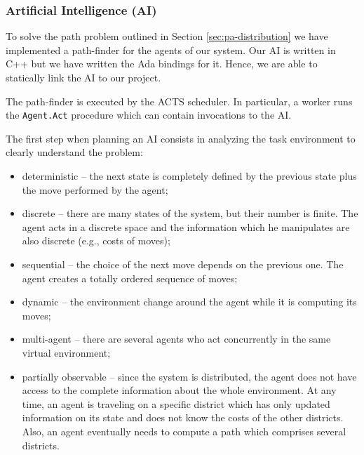\subsubsection{Artificial Intelligence (AI)}

To solve the path
problem outlined in Section \ref{sec:pa-distribution}
we have implemented a path-finder for the agents of our system.
Our AI is written in C++ but we have written the Ada bindings for it.
Hence, we are able to statically link the AI to our project.

The path-finder is executed by the ACTS scheduler. In particular, a
worker runs the \verb|Agent.Act| procedure which can contain invocations
to the AI.




The first step when planning an AI consists in analyzing the task environment
to clearly understand the problem:

\begin{itemize}

\item{deterministic} --
the next state is completely defined by the previous state plus the move
performed by the agent;

\item{discrete} --
there are many states of the system, but their number is finite.
The agent acts in a discrete space and the information which he manipulates
are also discrete (e.g., costs of moves);

\item{sequential} --
the choice of the next move depends on the previous one. The agent creates
a totally ordered sequence of moves;

\item{dynamic} --
the environment change around the agent while it is computing its moves;

\item{multi-agent} --
there are several agents who act concurrently in the same virtual
environment;

\item{partially observable} --
since the system is distributed, the agent does not have access to the complete
information about the whole environment. At any time, an agent is
traveling on a
specific district which has only updated information on its state and does not
know the costs of the other districts. Also, an agent eventually needs to
compute a path which comprises several districts.
\end{itemize}

